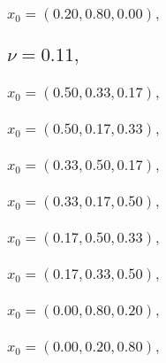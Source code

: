 \documentclass[a4paper]{article}
\begin{document}
\begin{multicols*}{2}
   \subsubsection{\(x_0 = (0.20,0.80,0.00),\quad \)}
   

   \subsection{\(\nu = 0.11,\quad \)}
   

   \subsubsection{\(x_0 = (0.50,0.33,0.17),\quad \)}
   

   \subsubsection{\(x_0 = (0.50,0.17,0.33),\quad \)}
   

   \subsubsection{\(x_0 = (0.33,0.50,0.17),\quad \)}
   

   \subsubsection{\(x_0 = (0.33,0.17,0.50),\quad \)}
   

   \subsubsection{\(x_0 = (0.17,0.50,0.33),\quad \)}
   

   \subsubsection{\(x_0 = (0.17,0.33,0.50),\quad \)}
   

   \subsubsection{\(x_0 = (0.00,0.80,0.20),\quad \)}
   

   \subsubsection{\(x_0 = (0.00,0.20,0.80),\quad \)}
   


\end{multicols*}
\end{document}
